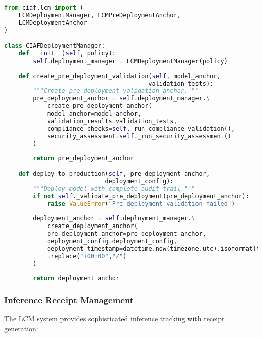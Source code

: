 \documentclass[12pt,a4paper]{article}
\begin{document}
\begin{lstlisting}[language=Python, caption=Deployment Manager Implementation]
from ciaf.lcm import (
    LCMDeploymentManager, LCMPreDeploymentAnchor,
    LCMDeploymentAnchor
)

class CIAFDeploymentManager:
    def __init__(self, policy):
        self.deployment_manager = LCMDeploymentManager(policy)
        
    def create_pre_deployment_validation(self, model_anchor, 
                                        validation_tests):
        """Create pre-deployment validation anchor."""
        pre_deployment_anchor = self.deployment_manager.\
            create_pre_deployment_anchor(
            model_anchor=model_anchor,
            validation_results=validation_tests,
            compliance_checks=self._run_compliance_validation(),
            security_assessment=self._run_security_assessment()
        )
        
        return pre_deployment_anchor
    
    def deploy_to_production(self, pre_deployment_anchor, 
                            deployment_config):
        """Deploy model with complete audit trail."""
        if not self._validate_pre_deployment(pre_deployment_anchor):
            raise ValueError("Pre-deployment validation failed")
            
        deployment_anchor = self.deployment_manager.\
            create_deployment_anchor(
            pre_deployment_anchor=pre_deployment_anchor,
            deployment_config=deployment_config,
            deployment_timestamp=datetime.now(timezone.utc).isoformat(timespec="microseconds")
            .replace("+00:00","Z")
        )
        
        return deployment_anchor
\end{lstlisting}

\subsubsection{Inference Receipt Management}

The LCM system provides sophisticated inference tracking with receipt generation:
\end{document}
